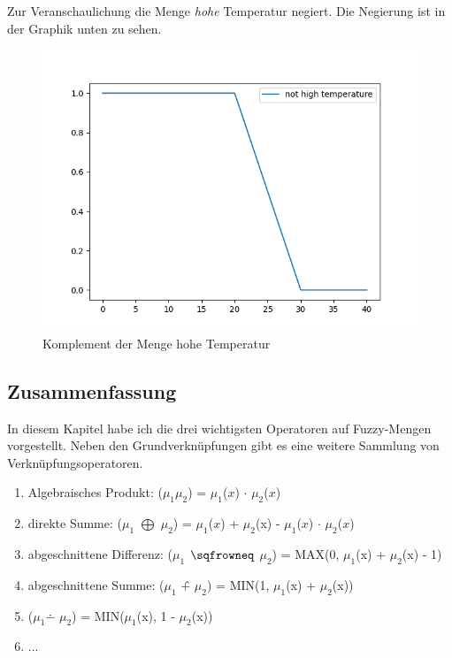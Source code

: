 Zur Veranschaulichung die Menge \textit{hohe} Temperatur negiert. Die Negierung ist in der Graphik unten zu sehen.


\begin{figure}[htbp]\label{not_high_temp}
	\centering
	\includegraphics[scale=0.5]{images/not_high_temp.png}
	\caption{Komplement der Menge hohe Temperatur}
\end{figure}

\subsection{Zusammenfassung}

In diesem Kapitel habe ich die drei wichtigsten Operatoren auf Fuzzy-Mengen vorgestellt. Neben den Grundverknüpfungen gibt es eine weitere Sammlung von Verknüpfungsoperatoren.

\begin{enumerate}
	\item Algebraisches Produkt: ($\mu_1$$\mu_2$) = $\mu_1$($x$) $\cdot$ $\mu_2$($x$)
	\item direkte Summe: ($\mu_1$ $\bigoplus$ $\mu_2$) = $\mu_1$($x$) + $\mu_2$(x) - $\mu_1$($x$) $\cdot$ $\mu_2$($x$)
	\item abgeschnittene Differenz: ($\mu_1$ $\sqfrowneq$ $\mu_2$) = MAX(0, $\mu_1$(x) + $\mu_2$(x) - 1)
	\item abgeschnittene Summe: ($\mu_1$ \^{+} $\mu_2$) = MIN(1, $\mu_1$(x) + $\mu_2$(x))
	\item ($\mu_1$$\dotminus$ $\mu_2$) = MIN($\mu_1$(x), 1 - $\mu_2$(x))
	\item ...
\end{enumerate}


